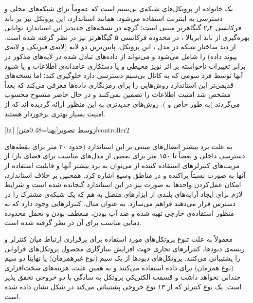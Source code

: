  یک خانواده از پروتکل‌های شبکه‌ی بی‌سیم است که عموماً برای شبکه‌های محلی و دسترسی به اینترنت استفاده می‌شود. همانند استاندارد، این پروتکل نیز بر باند فرکانسی ۲٫۴ گیگاهرتز مبتنی است؛ گرچه در نسخه‌های جدیدتر این استاندارد توانایی بهره‌گیری از باند ابربالا
،
در محدوده فرکانسی ۵ گیگاهرتز نیز در نظر گرفته شده است. از دید ساختار شبکه در مدل ،
این پروتکل، پایین‌ترین دو لایه (لایه‌ی فیزیکی و لایه‌ی پیوند داده) را شامل می‌شود و می‌تواند از داده‌های تبادل شده در لایه‌های مذکور در برابر تغییرات نا‌خواسته بر اثر نویز محیطی و یا دستکاری عامدانه‌ی اطلاعات و یا شنود آنها توسط فرد سومی که به کانال بی‌سیم دسترسی دارد جلوگیری کند؛ اما نسخه‌های قدیمی‌تر این استاندارد روش‌هایی را برای رمزنگاری داده‌ها معرفی می‌کند که بعداً مشخص شد امنیت اطلاعات را تضمین نمی‌کنند و در حال حاضر منسوخ محسوب می‌گردند (به طور خاص  و ). روش‌های جدیدتری به این منظور ارائه گردیده اند که از امنیت بسیار بهتری برخوردار هستند.

[ht]
‌ازوسط
‌تصویر[پهنا=0.48‌متن]{controller2}

به علت برد بیشتر اتصال‌های مبتنی بر این استاندارد (حدود ۲۰ متر برای نقطه‌های دسترسی داخلی و بعضاً تا ۱۵۰ متر برای بعضی از مدل‌های مناسب برای فضای باز) از مزیت‌های کنترلرهای استفاده کننده از  می‌توان به برد بیشتر آنها و قابلیت استفاده از آنها به صورت نسبتاً پراکنده و در مناطق وسیع اشاره کرد. همچنین بر خلاف استاندارد، امکان عمل‌کردن واحدها به صورت  نیز در این استاندارد گنجانده شده است و شرایط لازم برای ایجاد آرایه‌های بلندی از ابزارهای متصل به هم که یک شبکه‌ی مشترک را در دسترس قرار می‌دهند فراهم می‌سازد. به عنوان مثال، کنترلرهایی وجود دارد که به منظور استفاده‌ی خارجی تهیه شده و ضد آب بودن، منعطف بودن و تحمل محدوده دمایی مناسب برای آن در نظر گرفته شده است.

معمولاً به علت تنوع پروتکل‌های مورد استفاده برای برقراری ارتباط میان کنترلر و ریسه‌ی دیودها، کنترلرهای تجاری جهت افزایش سازگاری محصول پروتکل‌های فراوانی را پشتیبانی می‌کنند. پروتکل‌های دیودها از یک سیم (نوع غیرهمزمان) یا نهایتا دو سیم (نوع همزمان) برای داده استفاده می‌کنند و به همین علت، هزینه‌های سخت‌افزاری چندانی نخواهد داشت و قسمت الکتریکی پروتکل به سادگی با دو خروجی تحقق پذیر است. یک نوع کنترلر که از ۱۳ نوع خروجی پشتیبانی می‌کند در شکل  نشان داده شده است.

